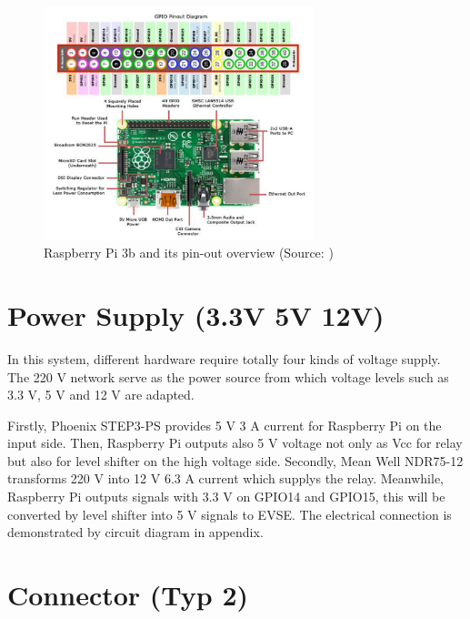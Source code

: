 \documentclass[
english,
ruledheaders=section,%
class=report,%
thesis={type=Report},%
accentcolor=9c,%
custommargins=true,%
marginpar=false,%
parskip=half-,%
fontsize=11pt,%
logofile={img/tuda_logo.pdf}, %
]{tudapub}
\begin{document}
    \begin{figure}[H]
        \centering
        \includegraphics[width=0.7\textwidth]{img/RaspberryPi3b_and_pin-out.jpg}
        \caption{Raspberry Pi 3b and its pin-out overview
            (Source: \cite{RaspberryPiOverview})}
        \label{fig:Raspberry Pi overview}
    \end{figure}




    \section{Power Supply (3.3V 5V 12V)}

    In this system, different hardware require totally four kinds of voltage supply. The 220 V network serve as the power source from which voltage levels such as 3.3 V, 5 V and 12 V are adapted.

    Firstly, Phoenix STEP3-PS provides 5 V 3 A current for Raspberry Pi on the input side. Then, Raspberry Pi outputs also 5 V voltage not only as Vcc for relay but also for level shifter on the high voltage side. Secondly, Mean Well NDR75-12 transforms 220 V into 12 V 6.3 A current which supplys the relay. Meanwhile, Raspberry Pi outputs signals with 3.3 V on GPIO14 and GPIO15, this will be converted by level shifter into 5 V signals to EVSE. The electrical connection is demonstrated by circuit diagram in appendix.

    \section{Connector (Typ 2)}
\end{document}
